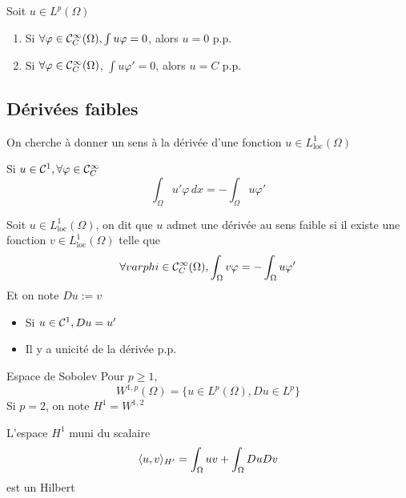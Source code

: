 \documentclass[]{report}
\begin{document}
    \begin{lm}{}{}
        Soit $u\in L^p(\Omega)$
        \begin{enumerate}
            \item Si $\forall \varphi\in \mathcal{C}_C^\infty(\Omega),\int u\varphi=0$, alors $u=0$ p.p.
            \item Si $\forall \varphi\in \mathcal{C}_C^\infty(\Omega)$, $\int u\varphi'=0$, alors $u=C$ p.p.
        \end{enumerate}
    \end{lm}

    \subsection{Dérivées faibles}

    On cherche à donner un sens à la dérivée d'une fonction $u\in L^1_{\text{loc}}(\Omega)$

    \begin{re}{}{}
        Si $u\in \mathcal{C}^1,\forall \varphi \in \mathcal{C}_C^{\infty}$
        \[\int_{\Omega}u'\varphi\, dx=-\int_{\Omega}u\varphi'\]
    \end{re}

    \begin{df}{}{}
        Soit $u\in L^1_{\text{loc}}(\Omega)$, on dit que $u$ admet une dérivée au sens faible si il existe une fonction $v\in L^1_{\text{loc}}(\Omega)$ telle que
        \[\forall varphi\in \mathcal{C}_C^{\infty}(\Omega),\int_{\Omega}v \varphi=-\int_{\Omega} u\varphi'\]
        Et on note $Du:=v$
    \end{df}

    \begin{re}{}{}
        \begin{itemize}
            \item Si $u\in \mathcal{C}^1,Du=u'$
            \item Il y a unicité de la dérivée p.p.
        \end{itemize}
    \end{re}

    \begin{df}{Espace de Sobolev}{}
        Pour $p\ge 1$,
        \[W^{1,p}(\Omega)=\{u\in L^p(\Omega),Du\in L^p\}\]
        Si $p=2$, on note $H^1=W^{1,2}$
    \end{df}

    \begin{prop}{}{}
        L'espace $H^1$ muni du scalaire
        \[\langle u,v \rangle_{H'}=\int_{\Omega}uv+\int_{\Omega}Du Dv\]
        est un Hilbert
    \end{prop}
\end{document}
